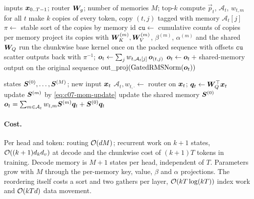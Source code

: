 \begin{algorithm}[t]
\caption{MoM layer: forward pass by token reordering (one sequence).}
\label{alg:c07-mom-fwd}
\begin{algorithmic}[1]
\Require inputs $\bm{x}_{0..T-1}$; router $\bm{W}_g$; number of memories $M$; top-$k$
\State compute $\vec p_t$, $\mathcal{A}_t$, $w_{t,m}$ for all $t$ 
\State make $k$ copies of every token, copy $(t,j)$ tagged with memory $\mathcal{A}_t[j]$
\State $\pi \gets$ stable sort of the copies by memory id 
\State $\mathtt{cu} \gets$ cumulative counts of copies per memory 
   \State project its copies with $\bm{W}_K^{(m)},\bm{W}_V^{(m)}$, $\beta^{(m)}$, $\alpha^{(m)}$ and the shared $\bm{W}_Q$
\EndFor
\State run the chunkwise base kernel once on the packed sequence with offsets $\mathtt{cu}$
\State scatter outputs back with $\pi^{-1}$; $\bm{o}_t \gets \sum_j w_{t,\mathcal{A}_t[j]}\,\bm{o}_{(t,j)}$
\State $\bm{o}_t \gets \bm{o}_t + {}$shared-memory output on the original sequence
\State \Return $\operatorname{out\_proj}(\operatorname{GatedRMSNorm}(\bm{o}_t))$
\end{algorithmic}
\end{algorithm}

\begin{algorithm}[t]
\caption{MoM layer: one decoding step.}
\label{alg:c07-mom-decode}
\begin{algorithmic}[1]
\Require states $\bm{S}^{(0)},\dots,\bm{S}^{(M)}$; new input $\bm{x}_t$
\State $\mathcal{A}_t, w_{t,\cdot} \gets$ router on $\bm{x}_t$; $\bm{q}_t \gets \bm{W}_Q^{\top}\bm{x}_t$
 update $\bm{S}^{(m)}$ by \cref{eq:c07-mom-update} \EndFor {}
\State update the shared memory $\bm{S}^{(0)}$
\State \Return $\bm{o}_t = \sum_{m\in\mathcal{A}_t}w_{t,m}\bm{S}^{(m)}\bm{q}_t + \bm{S}^{(0)}\bm{q}_t$
\end{algorithmic}
\end{algorithm}

\paragraph{Cost.} Per head and token: routing $\mathcal{O}(dM)$; recurrent work on $k+1$ states,
$\mathcal{O}((k+1)d_kd_v)$ at decode and the chunkwise cost of $(k+1)T$ tokens in training. Decode
memory is $M+1$ states per head, independent of $T$. Parameters grow with $M$ through the
per-memory key, value, $\beta$ and $\alpha$ projections. The reordering itself costs a sort
and two gathers per layer, $\mathcal{O}(kT\log(kT))$ index work and $\mathcal{O}(kTd)$ data movement.

